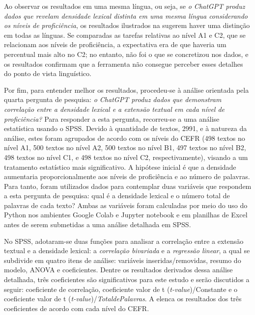 \documentclass[portuguese]{textolivre}
\begin{document}
Ao observar os resultados em uma mesma língua, ou seja, se \textit{o ChatGPT produz dados que revelam densidade lexical distinta em uma mesma língua considerando os níveis de proficiência}, os resultados ilustrados na  sugerem haver uma distinção em todas as línguas. Se comparadas as tarefas relativas ao nível A1 e C2, que se relacionam aos níveis de proficiência, a expectativa era de que haveria um percentual mais alto no C2; no entanto, não foi o que se concretizou nos dados, e os resultados confirmam que a ferramenta não consegue perceber esses detalhes do ponto de vista linguístico.

Por fim, para entender melhor os resultados, procedeu-se à análise orientada pela quarta pergunta de pesquisa: \textit{o ChatGPT produz dados que demonstram correlação entre a densidade lexical e a extensão textual em cada nível de proficiência?} Para responder a esta pergunta, recorreu-se a uma análise estatística usando o SPSS. Devido à quantidade de textos, 2991, e à natureza da análise, estes foram agrupados de acordo com os níveis do CEFR (498 textos no nível A1, 500 textos no nível A2, 500 textos no nível B1, 497 textos no nível B2, 498 textos no nível C1, e 498 textos no nível C2, respectivamente), visando a um tratamento estatístico mais significativo. A hipótese inicial é que a densidade aumentaria proporcionalmente aos níveis de proficiência e ao número de palavras. Para tanto, foram utilizados dados para contemplar duas variáveis que respondem a esta pergunta de pesquisa: qual é a densidade lexical e o número total de palavras de cada texto? Ambas as variáveis foram calculadas por meio do uso do Python nos ambientes Google Colab e Jupyter notebook e em planilhas de Excel antes de serem submetidas a uma análise detalhada em SPSS.

No SPSS, adotaram-se duas funções para analisar a correlação entre a extensão textual e a densidade lexical: a \textit{correlação bivariada} e a \textit{regressão linear}, a qual se subdivide em quatro itens de análise: variáveis inseridas/removidas, resumo do modelo, ANOVA e coeficientes. Dentre os resultados derivados dessa análise detalhada, três coeficientes são significativos para este estudo e serão discutidos a seguir: coeficiente de correlação, coeficiente valor de t (\textit{t-value})/Constante e o coeficiente valor de t (\textit{t-value})/\textit{TotaldePalavras}. A  elenca os resultados dos três coeficientes de acordo com cada nível do CEFR.
\end{document}
